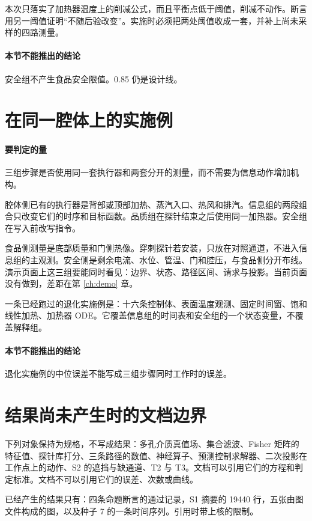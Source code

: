 本次只落实了加热器温度上的削减公式，而且平衡点低于阈值，削减不动作。断言用另一阈值证明“不随后验改变”。实施时必须把两处阈值收成一套，并补上尚未采样的四路测量。

\paragraph{本节不能推出的结论}
安全组不产生食品安全限值。0.85 仍是设计线。

\section{在同一腔体上的实施例}

\paragraph{要判定的量}
三组步骤是否使用同一套执行器和两套分开的测量，而不需要为信息动作增加机构。

腔体侧已有的执行器是背部或顶部加热、蒸汽入口、热风和排汽。信息组的两段组合只改变它们的时序和目标函数。品质组在探针结束之后使用同一加热器。安全组在写入前改写指令。

食品侧测量是底部质量和门侧热像。穿刺探针若安装，只放在对照通道，不进入信息组的主观测。安全侧是剩余电流、水位、管温、门和腔压，与食品侧分开布线。演示页面上这三组要能同时看见：边界、状态、路径区间、请求与投影。当前页面没有做到，差距在第 \ref{ch:demo} 章。

一条已经跑过的退化实施例是：十六条控制体、表面温度观测、固定时间窗、饱和线性加热、加热器 ODE。它覆盖信息组的时间表和安全组的一个状态变量，不覆盖解释组。

\paragraph{本节不能推出的结论}
退化实施例的中位误差不能写成三组步骤同时工作时的误差。

\section{结果尚未产生时的文档边界}

下列对象保持为规格，不写成结果：多孔介质真值场、集合滤波、Fisher 矩阵的特征值、探针库打分、三条路径的数值、神经算子、预测控制求解器、二次投影在工作点上的动作、S2 的遮挡与缺通道、T2 与 T3。文档可以引用它们的方程和判定标准。文档不可以引用它们的误差、次数或曲线。

已经产生的结果只有：四条命题断言的通过记录，S1 摘要的 19440 行，五张由图文件构成的图，以及种子 7 的一条时间序列。引用时带上核的限制。

